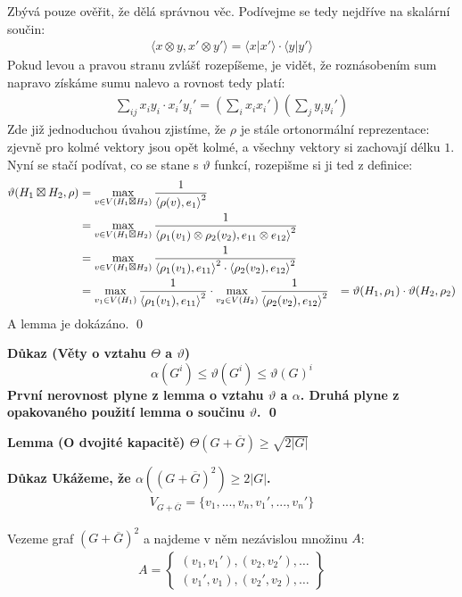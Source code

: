 \documentclass[a4paper,12pt,titlepage]{article}
\newcommand{\shn}{\Theta}
\newcommand{\lm}{\smallskip\noindent\bf Lemma\rm{} }
\newcommand{\dk}{\smallskip\noindent\bf Důkaz\rm{} }
\newcommand{\sk}[1]{{\langle #1\rangle}}
\begin{document}
Zbývá pouze ověřit, že dělá správnou věc. Podívejme se tedy nejdříve na skalární 
součin:
\begin{align}
	\sk{x \otimes y , x' \otimes y'} = \sk{x | x'} \cdot \sk{y | y'}
\end{align}
Pokud levou a pravou stranu zvlášť rozepíšeme, je vidět, že roznásobením sum 
napravo získáme sumu nalevo a rovnost tedy platí:
\begin{align}
	\sum_{ij} x_iy_i \cdot x_i' y_i' = \left( \sum_i x_ix_i'\right) \left(\sum_j 
	y_iy_i' \right)
\end{align}
Zde již jednoduchou úvahou zjistíme, že $\rho$ je stále ortonormální 
reprezentace: zjevně pro kolmé vektory jsou opět kolmé, a všechny vektory si 
zachovají délku $1$. Nyní se stačí podívat, co se stane s $\vartheta$ funkcí, 
rozepišme si ji ted z definice:
\begin{align*}
	\vartheta(H_1 \boxtimes H_2, \rho) &= \max_{v\in V(H_1 \boxtimes H_2)} { 1 
	\over \sk{\rho(v) , e_1}^2} \\
	&= \max_{v\in V(H_1 \boxtimes H_2)} { 1 \over \sk{\rho_1(v_1)\otimes \rho_2(v_2) , e_{11} \otimes e_{12}}^2} \\
	&= \max_{v\in V(H_1 \boxtimes H_2)} { 1 \over \sk{\rho_1(v_1) , e_{11}}^2
		\cdot \sk{\rho_2(v_2) , e_{12}}^2} \\
	&= \max_{v_1\in V(H_1)} { 1 \over \sk{\rho_1(v_1) , e_{11}}^2} \cdot
	  \max_{v_2\in V(H_2)} { 1 \over \sk{\rho_2(v_2) , e_{12}}^2} 
	&= \vartheta(H_1,\rho_1) \cdot \vartheta(H_2, \rho_2)
\end{align*}
A lemma je dokázáno. \qed


\dk (Věty o vztahu $\Theta$ a $\vartheta$)  $$\alpha(G^i) \le \vartheta(G^i) \le \vartheta(G)^i$$
První nerovnost plyne z lemma o vztahu $\vartheta$ a $\alpha$. Druhá plyne z
opakovaného použití lemma o součinu $\vartheta$.
\qed


\lm (O dvojité kapacitě) $\shn(G + \overline{G}) \ge \sqrt{2|G|}$

\dk Ukážeme, že $\alpha ((G+\overline G)^2) \geq 2|G|$.
\begin{align*}
	V_{G+\overline G} = \{ v_1, ..., v_n, v_1', ..., v_n'\}
\end{align*}

Vezeme graf $(G+\overline G)^2$ a najdeme v něm nezávislou množinu $A$:
\begin{align*}
	A = \left\{\begin{matrix}
		(v_1, v_1'), (v_2, v_2'), \dots \\
		(v_1', v_1), (v_2', v_2), \dots
		\end{matrix}\right\}
\end{align*}
\end{document}
